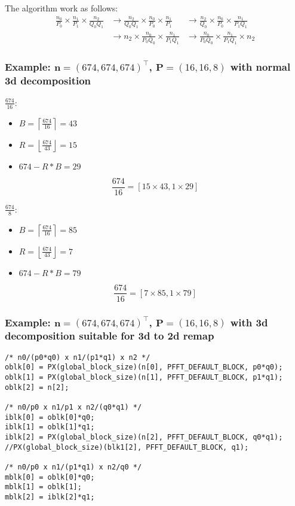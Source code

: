 The algorithm work as follows:
\begin{align*}
  \frac{n_0}{P_0} \times \frac{n_1}{P_1} \times \frac{n_2}{Q_0Q_1}
  &\to
  \frac{n_2}{Q_0Q_1} \times \frac{n_0}{P_0} \times \frac{n_1}{P_1}
  &\to
  \frac{n_2}{Q_0} \times \frac{n_0}{P_0} \times \frac{n_1}{P_1Q_1} \\
  &\to
  n_2 \times \frac{n_0}{P_0Q_0} \times \frac{n_1}{P_1Q_1}
  &\to
  \frac{n_0}{P_0Q_0} \times \frac{n_1}{P_1Q_1} \times n_2
\end{align*}

\subsubsection{Example: $\mathbf n=(674, 674, 674)^\top$, $\mathbf P = (16,16,8)$ with normal 3d decomposition}
$\frac{674}{16}$:
\begin{itemize}
 \item $B = \left\lceil \frac{674}{16} \right\rceil = 43$
 \item $R = \left\lfloor \frac{674}{43} \right\rfloor = 15$
 \item $674 - R*B = 29$ 
\end{itemize}
\begin{equation*}
  \frac{674}{16} = \left[15\times 43, 1\times 29 \right]
\end{equation*}

$\frac{674}{8}$:
\begin{itemize}
 \item $B = \left\lceil \frac{674}{16} \right\rceil = 85$
 \item $R = \left\lfloor \frac{674}{43} \right\rfloor = 7$
 \item $674 - R*B = 79$
\end{itemize}
\begin{equation*}
  \frac{674}{16} = \left[7\times 85, 1\times 79 \right]
\end{equation*}

\subsubsection{Example: $\mathbf n=(674, 674, 674)^\top$, $\mathbf P = (16,16,8)$ with 3d decomposition suitable for 3d to 2d remap}

\begin{lstlisting}
/* n0/(p0*q0) x n1/(p1*q1) x n2 */
oblk[0] = PX(global_block_size)(n[0], PFFT_DEFAULT_BLOCK, p0*q0);
oblk[1] = PX(global_block_size)(n[1], PFFT_DEFAULT_BLOCK, p1*q1);
oblk[2] = n[2];

/* n0/p0 x n1/p1 x n2/(q0*q1) */
iblk[0] = oblk[0]*q0;
iblk[1] = oblk[1]*q1;
iblk[2] = PX(global_block_size)(n[2], PFFT_DEFAULT_BLOCK, q0*q1);
//PX(global_block_size)(blk1[2], PFFT_DEFAULT_BLOCK, q1);

/* n0/p0 x n1/(p1*q1) x n2/q0 */
mblk[0] = oblk[0]*q0;
mblk[1] = oblk[1];
mblk[2] = iblk[2]*q1;
\end{lstlisting}

